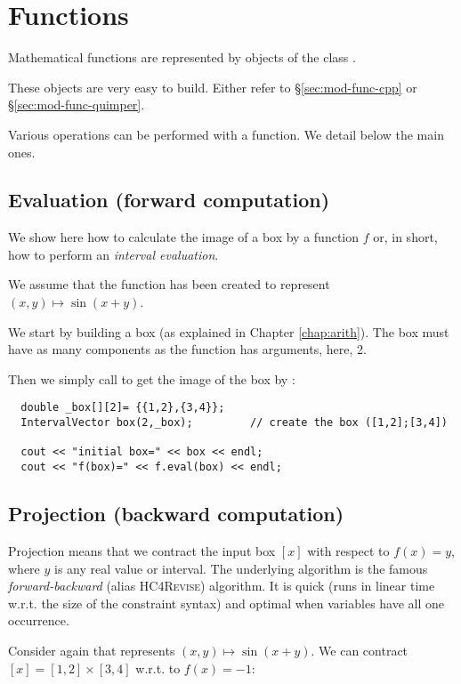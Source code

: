 \section{Functions}\label{sec:mod-func}

Mathematical functions are represented by objects of the class .

These objects are very easy to build. Either refer to \S\ref{sec:mod-func-cpp}
or \S\ref{sec:mod-func-quimper}.

Various operations can be performed with a function. We detail below the main ones.

\subsection{Evaluation (forward computation)}

We show here how to calculate the image of a box by a function $f$ or, in short, how
to perform an {\it interval evaluation}.

We assume that the function  has been created to represent $(x,y)\mapsto \sin(x+y)$.

We start by building a box (as explained in Chapter \ref{chap:arith}).
The box must have as many components as the function has arguments, here, 2.

Then we simply call  to get the image of the box by :

\begin{lstlisting}
  double _box[][2]= {{1,2},{3,4}};
  IntervalVector box(2,_box);         // create the box ([1,2];[3,4])

  cout << "initial box=" << box << endl;
  cout << "f(box)=" << f.eval(box) << endl; 
\end{lstlisting}

\subsection{Projection (backward computation)}
	
Projection means that we contract the input box $[x]$
with respect to $f(x)=y$, where $y$ is any real value or interval.
The underlying algorithm is the famous {\it forward-backward} (alias \textsc{HC4Revise})
algorithm. It is quick (runs in linear time w.r.t. the size
of the constraint syntax) and optimal when variables have all one occurrence.

Consider again that  represents $(x,y)\mapsto\sin(x+y)$.
We can contract $[x]=[1,2]\times[3,4]$ w.r.t.
to $f(x)=-1$:

